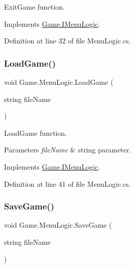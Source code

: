 Exit\+Game function. 



Implements \mbox{\hyperlink{interface_game_1_1_i_menu_logic_a5db6fe816331b646a2f7a2ac889fff26}{Game.\+I\+Menu\+Logic}}.



Definition at line 32 of file Menu\+Logic.\+cs.

\mbox{\label{class_game_1_1_menu_logic_a10ee91edfc847eeb03576cf512212695}} 
\subsubsection{\texorpdfstring{LoadGame()}{LoadGame()}}
{\footnotesize\ttfamily void Game.\+Menu\+Logic.\+Load\+Game (\begin{DoxyParamCaption}\item[{string}]{file\+Name }\end{DoxyParamCaption})}



Load\+Game function. 


\begin{DoxyParams}{Parameters}
{\em file\+Name} & string parameter.\\
\hline
\end{DoxyParams}


Implements \mbox{\hyperlink{interface_game_1_1_i_menu_logic_a6a8e5c2d0407676f4f39d3fd81124aef}{Game.\+I\+Menu\+Logic}}.



Definition at line 41 of file Menu\+Logic.\+cs.

\mbox{\label{class_game_1_1_menu_logic_a01964f3a56734ce48d1e74ce3d47f246}} 
\subsubsection{\texorpdfstring{SaveGame()}{SaveGame()}}
{\footnotesize\ttfamily void Game.\+Menu\+Logic.\+Save\+Game (\begin{DoxyParamCaption}\item[{string}]{file\+Name }\end{DoxyParamCaption})}



